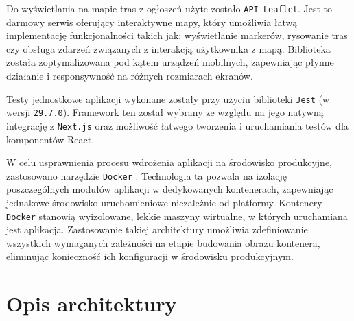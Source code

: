 Do wyświetlania na mapie tras z ogłoszeń użyte zostało \texttt{API Leaflet}. Jest to darmowy serwis oferujący interaktywne mapy, który umożliwia łatwą implementację funkcjonalności takich jak: wyświetlanie markerów, rysowanie tras czy obsługa zdarzeń związanych z interakcją użytkownika z mapą. Biblioteka została zoptymalizowana pod kątem urządzeń mobilnych, zapewniając płynne działanie i responsywność na różnych rozmiarach ekranów.

Testy jednostkowe aplikacji wykonane zostały przy użyciu biblioteki \texttt{Jest} \cite{Jest} (w wersji \texttt{29.7.0}). Framework ten został wybrany ze względu na jego natywną integrację z \texttt{Next.js} oraz możliwość łatwego tworzenia i uruchamiania testów dla komponentów React.

W celu usprawnienia procesu wdrożenia aplikacji na środowisko produkcyjne, zastosowano narzędzie \texttt{Docker} \cite{Docker}. Technologia ta pozwala na izolację poszczególnych modułów aplikacji w dedykowanych kontenerach, zapewniając jednakowe środowisko uruchomieniowe niezależnie od platformy. Kontenery \texttt{Docker} stanowią wyizolowane, lekkie maszyny wirtualne, w których uruchamiana jest aplikacja. Zastosowanie takiej architektury umożliwia zdefiniowanie wszystkich wymaganych zależności na etapie budowania obrazu kontenera, eliminując konieczność ich konfiguracji w środowisku produkcyjnym.

\section{Opis architektury}
